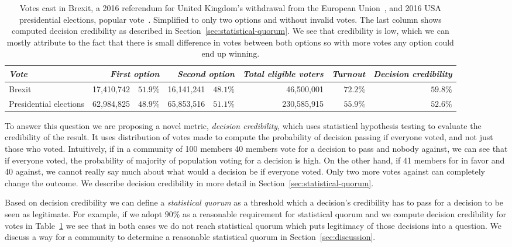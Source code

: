 \documentclass[chi_draft]{sigchi}
\begin{document}
\begin{table}
  \centering
  \begin{tabular}{l r r r r r r r}
    {\small\textit{Vote}} & \multicolumn{2}{r}{\small \textit{First option}} & \multicolumn{2}{r}{\small \textit{Second option}} & {\small \textit{Total eligible voters}} & {\small \textit{Turnout}} & {\small \textit{Decision credibility}} \\
    \midrule
    Brexit & 17,410,742 & $51.9\%$ & 16,141,241 & $48.1\%$ & 46,500,001 & $72.2\%$ & $59.8\%$ \\
    Presidential elections & 62,984,825 & $48.9\%$ & 65,853,516 & $51.1\%$ & 230,585,915 & $55.9\%$ & $52.6\%$ \\
  \end{tabular}
  \caption{Votes cast in Brexit, a 2016 referendum for United Kingdom's withdrawal from the European Union~\protect\cite{brexitresults},
  and 2016 USA presidential elections, popular vote~\protect\cite{usaresults1,usaresults2}. Simplified to only two options and without
  invalid votes. The last column shows computed decision credibility as described in Section~\ref{sec:statistical-quorum}. We see that
  credibility is low, which we can mostly attribute to the fact that there is small difference in votes between both options so
  with more votes any option could end up winning.}\label{tab:example}
\end{table}

To answer this question we are proposing a novel metric, \emph{decision credibility}, which uses statistical
hypothesis testing to evaluate the credibility of the result.
It uses distribution of votes made to compute the probability of decision passing if everyone voted,
and not just those who voted.
Intuitively, if in a community of 100 members 40 members vote for a decision to pass and nobody against,
we can see that if everyone voted, the probability of majority of population voting for a decision is high.
On the other hand, if 41 members for in favor and 40 against, we cannot really say much about what would a decision
be if everyone voted.
Only two more votes against can completely change the outcome.
We describe decision credibility in more detail in Section~\ref{sec:statistical-quorum}.

Based on decision credibility we can define a \emph{statistical quorum} as a threshold which a decision's credibility
has to pass for a decision to be seen as legitimate.
For example, if we adopt $90\%$ as a reasonable requirement for statistical quorum and we compute decision
credibility for votes in Table~\ref{tab:example} we see that in both cases we do not reach statistical quorum
which puts legitimacy of those decisions into a question.
We discuss a way for a community to determine a reasonable statistical quorum in Section~\ref{sec:discussion}.
\end{document}
